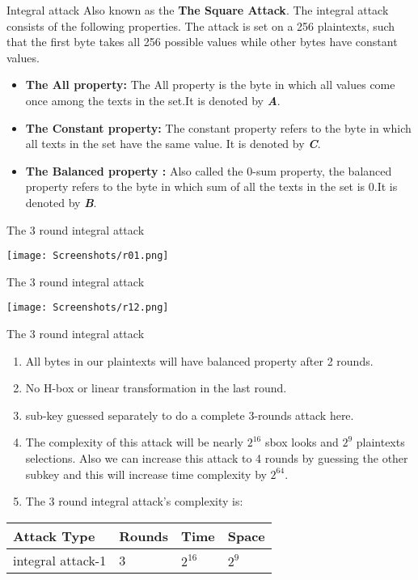 \begin{frame}{Integral attack}
Also known as the \textbf{The Square Attack}. The integral attack consists of the following properties.
The attack is set on a
256 plaintexts, such that the first byte takes all 256 possible values
while other bytes have constant values.
\begin{itemize}
    \item \textbf{The All property: }The All property is the byte in which all values come once among the texts in the set.It is denoted by \textit{\textbf{A}}.
    \item \textbf{The Constant property: }The constant property refers to the byte in which all texts in the set have the same value. It is denoted by \textit{\textbf{C}}.
    \item \textbf{The Balanced property : }Also called the 0-sum property, the balanced property refers to the byte in which sum of all the texts in the set is 0.It is denoted by \textit{\textbf{B}}.
\end{itemize}
\end{frame}

\begin{frame}{The 3 round integral attack}
    \begin{center}
    \texttt{[image: Screenshots/r01.png]}  
\end{center} 
\end{frame}

\begin{frame}{The 3 round integral attack}
    \begin{center}
    \texttt{[image: Screenshots/r12.png]}  
\end{center} 
\end{frame}

\begin{frame}{The 3 round integral attack}
\begin{enumerate}
    \item All bytes in our plaintexts will have balanced property after 2 rounds.
    \item No H-box or linear transformation in the last round.
    \item sub-key guessed separately to do a complete 3-rounds attack here.
    \item The complexity of this attack will be nearly $2^{16}$ sbox looks and $2^9$ plaintexts selections. Also we can increase this attack to 4 rounds by guessing the other subkey and this will increase time complexity by $2^{64}$.
    \item The 3 round integral attack's complexity is:
\end{enumerate}
\begin{table}[h]
\centering
\begin{tabular}{|l|l|l|l|}
\hline
Attack Type     & Rounds & Time     & Space \\ \hline
integral attack-1 & 3      & $2^{16}$ & $2^9$ \\ \hline
\end{tabular}
\end{table}
\end{frame}

